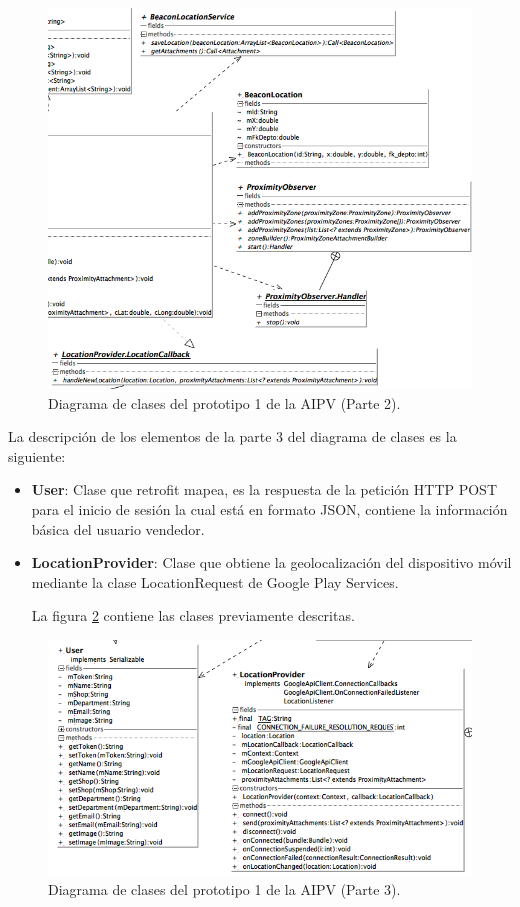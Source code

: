 \FloatBarrier
\begin{figure}[htbp!]
		\centering
			\includegraphics[width=.9 \textwidth]{imagenes/adrian/vendedor/prototipo1/clases_2}
		\caption{Diagrama de clases del prototipo 1 de la AIPV (Parte 2).}
	     \label{clases-AIPV1-parte2}
\end{figure}
\FloatBarrier

La descripción de los elementos de la parte 3 del diagrama de clases es la siguiente: 

\begin{itemize}
\item \textbf{User}: Clase que retrofit mapea, es la respuesta de la petición HTTP POST para el inicio de sesión la cual está en formato JSON, contiene la información básica del usuario vendedor.
\item \textbf{LocationProvider}: Clase que obtiene la geolocalización del dispositivo móvil mediante la clase LocationRequest de Google Play Services.

La figura \ref{clases-AIPV1-parte3} contiene las clases previamente descritas.

\end{itemize}
\FloatBarrier
\begin{figure}[htbp!]
		\centering
			\includegraphics[width=.9 \textwidth]{imagenes/adrian/vendedor/prototipo1/clases_3}
		\caption{Diagrama de clases del prototipo 1 de la AIPV (Parte 3).}
		\label{clases-AIPV1-parte3}
\end{figure}
\FloatBarrier

